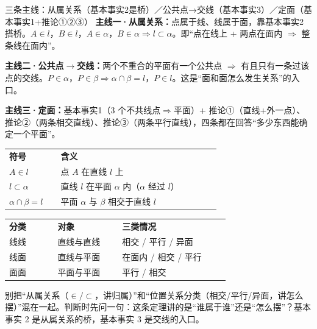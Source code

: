 \documentclass{exam-zh}
\begin{document}
\begin{eduSolutionBox}{三条主线：从属关系（基本事实2是桥）／公共点→交线（基本事实3）／定面（基本事实1+推论①②③）}
  \begingroup
  \setlength{\parskip}{2.5mm}
\textbf{主线一·从属关系：}点属于线、线属于面，靠基本事实2搭桥。$A\in l$，$B\in l$，$A\in\alpha$，$B\in\alpha\Rightarrow l\subset\alpha$。即“点在线上 + 两点在面内 $\Rightarrow$ 整条线在面内”。\par
\textbf{主线二·公共点$\to$交线：}两个不重合的平面有一个公共点 $\Rightarrow$ 有且只有一条过该点的交线。$P\in\alpha$，$P\in\beta\Rightarrow\alpha\cap\beta=l$，$P\in l$。这是“面和面怎么发生关系”的入口。\par
\textbf{主线三·定面：}基本事实1（3 个不共线点$\Rightarrow$平面）+ 推论①（直线+外一点）、推论②（两条相交直线）、推论③（两条平行直线），四条都在回答“多少东西能确定一个平面”。\par
\begin{tabular}{p{0.20\linewidth}p{0.62\linewidth}}
\textbf{符号} & \textbf{含义}\\
$A\in l$ & 点 $A$ 在直线 $l$ 上\\
$l\subset\alpha$ & 直线 $l$ 在平面 $\alpha$ 内（$\alpha$ 经过 $l$）\\
$\alpha\cap\beta=l$ & 平面 $\alpha$ 与 $\beta$ 相交于直线 $l$\\
\end{tabular}
\par
\begin{tabular}{p{0.18\linewidth}p{0.24\linewidth}p{0.40\linewidth}}
\textbf{分类} & \textbf{对象} & \textbf{三类情况}\\
线线 & 直线与直线 & 相交 / 平行 / 异面\\
线面 & 直线与平面 & 在面内 / 相交 / 平行\\
面面 & 平面与平面 & 平行 / 相交\\
\end{tabular}
\par
  \endgroup
\end{eduSolutionBox}




\begin{eduMistakeBox}
别把“从属关系（$\in/\subset$，讲归属）”和“位置关系分类（相交/平行/异面，讲怎么摆）”混在一起。判断时先问一句：这条定理讲的是“谁属于谁”还是“怎么摆”？基本事实 2 是从属关系的桥，基本事实 3 是交线的入口。\end{eduMistakeBox}



\clearpage
{}
\end{document}
